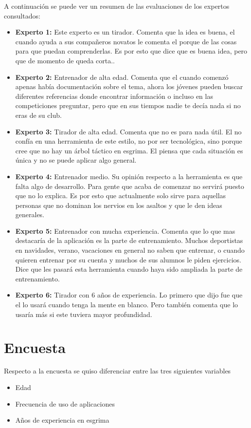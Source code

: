 A continuación se puede ver un resumen de las evaluaciones de los expertos consultados:
\begin{itemize}
  \item \textbf{Experto 1:} Este experto es un tirador. Comenta que la idea es buena, el cuando ayuda
    a sus compañeros novatos le comenta el porque de las cosas para que puedan comprenderlas. Es por esto
    que dice que es buena idea, pero que de momento de queda corta..
  \item \textbf{Experto 2:} Entrenador de alta edad. Comenta que el cuando comenzó apenas había documentación
    sobre el tema, ahora los jóvenes pueden buscar diferentes referencias donde encontrar información
    o incluso en las competiciones preguntar, pero que en sus tiempos nadie te decía nada si no eras de su club.
  \item \textbf{Experto 3:} Tirador de alta edad. Comenta que no es para nada útil. El no confía en una herramienta
    de este estilo, no por ser tecnológica, sino porque cree que no hay un árbol táctico en esgrima. El piensa que
    cada situación es única y no se puede aplicar algo general.
  \item \textbf{Experto 4:} Entrenador medio. Su opinión respecto a la herramienta es que falta algo de desarrollo.
    Para gente que acaba de comenzar no servirá puesto que no lo explica. Es por esto que actualmente solo sirve
    para aquellas personas que no dominan los nervios en los asaltos y que le den ideas generales.
  \item \textbf{Experto 5:} Entrenador con mucha experiencia. Comenta que lo que mas destacaría de la aplicación
    es la parte de entrenamiento. Muchos deportistas en navidades, verano, vacaciones en general no saben que entrenar, o cuando
    quieren entrenar por su cuenta y muchos de sus alumnos le piden ejercicios. Dice que les pasará esta herramienta cuando haya
    sido ampliada la parte de entrenamiento.
  \item \textbf{Experto 6:} Tirador con 6 años de experiencia. Lo primero que dijo fue que el lo usará cuando tenga la mente en blanco.
    Pero también comenta que lo usaría más si este tuviera mayor profundidad.
\end{itemize}

\section{Encuesta}

Respecto a la encuesta se quiso diferenciar entre las tres siguientes variables
\begin{itemize}
  \item Edad
  \item Frecuencia de uso de aplicaciones
  \item Años de experiencia en esgrima
\end{itemize}

